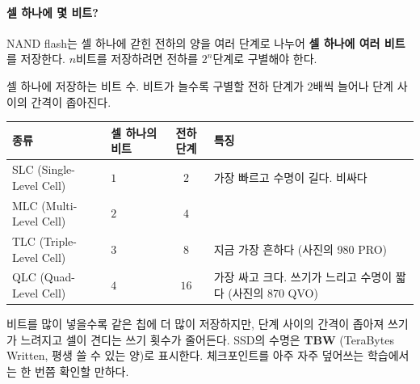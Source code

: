 \documentclass[11pt,a4paper]{article}
\begin{document}
\paragraph{셀 하나에 몇 비트?}
NAND flash는 셀 하나에 갇힌 전하의 양을 여러 단계로 나누어 \textbf{셀 하나에 여러 비트}를 저장한다.
$n$비트를 저장하려면 전하를 $2^n$단계로 구별해야 한다.

\begin{center}
\begin{minipage}{\textwidth}\centering
{}

\small 셀 하나에 저장하는 비트 수. 비트가 늘수록 구별할 전하 단계가 $2$배씩 늘어나 단계 사이의 간격이 좁아진다.
\end{minipage}
\end{center}

\begin{center}
{\small
\begin{tabular}{@{}llc>{\raggedright\arraybackslash}p{66mm}@{}}
\toprule
종류 & 셀 하나의 비트 & 전하 단계 & 특징 \\
\midrule
SLC (Single-Level Cell) & $1$ & $2$ & 가장 빠르고 수명이 길다. 비싸다 \\
MLC (Multi-Level Cell) & $2$ & $4$ & \\
TLC (Triple-Level Cell) & $3$ & $8$ & 지금 가장 흔하다 (사진의 980 PRO) \\
QLC (Quad-Level Cell) & $4$ & $16$ & 가장 싸고 크다. 쓰기가 느리고 수명이 짧다 (사진의 870 QVO) \\
\bottomrule
\end{tabular}}
\end{center}

비트를 많이 넣을수록 같은 칩에 더 많이 저장하지만, 단계 사이의 간격이 좁아져 쓰기가 느려지고 셀이 견디는 쓰기 횟수가 줄어든다.
SSD의 수명은 \textbf{TBW} (TeraBytes Written, 평생 쓸 수 있는 양)로 표시한다. 체크포인트를 아주 자주 덮어쓰는 학습에서는 한 번쯤 확인할 만하다.
\end{document}
